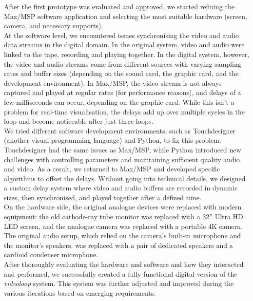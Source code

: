 After the first prototype was evaluated and approved, we started refining the Max/MSP software application and selecting the most suitable hardware (screen, camera, and necessary supports).\\
At the software level, we encountered issues synchronising the video and audio data streams in the digital domain. In the original system, video and audio were linked to the tape, recording and playing together. In the digital system, however, the video and audio streams come from different sources with varying sampling rates and buffer sizes (depending on the sound card, the graphic card, and the development environment). In Max/MSP, the video stream is not always captured and played at regular rates (for performance reasons), and delays of a few milliseconds can occur, depending on the graphic card. While this isn’t a problem for real-time visualisation, the delays add up over multiple cycles in the loop and become noticeable after just three loops.\\
We tried different software development environments, such as Touchdesigner (another visual programming language) and Python, to fix this problem. Touchdesigner had the same issues as Max/MSP, while Python introduced new challenges with controlling parameters and maintaining sufficient quality audio and video. As a result, we returned to Max/MSP and developed specific algorithms to offset the delays. Without going into technical details, we designed a custom delay system where video and audio buffers are recorded in dynamic sizes, then synchronised, and played together after a defined time.\\
On the hardware side, the original analogue devices were replaced with modern equipment: the old cathode-ray tube monitor was replaced with a 32” Ultra HD LED screen, and the analogue camera was replaced with a portable 4K camera. The original audio setup, which relied on the camera's built-in microphone and the monitor's speakers, was replaced with a pair of dedicated speakers and a cardioid condenser microphone.\\
After thoroughly evaluating the hardware and software and how they interacted and performed, we successfully created a fully functional digital version of the \textit{videoloop} system. This system was further adjusted and improved during the various iterations based on emerging requirements.

